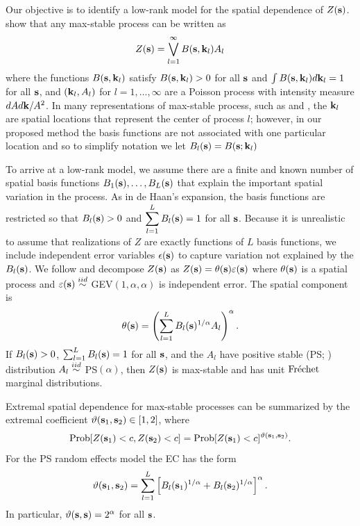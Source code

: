 Our objective is to identify a low-rank model for the spatial dependence of $Z(\mathbf{s})$.
 show that any max-stable process can be written as
\begin{align} \label{ebeq:spectral}
  Z(\mathbf{s}) = \bigvee_{l = 1}^{\infty} B(\mathbf{s}, \mathbf{k}_l)A_{l}
\end{align}
where the functions $B(\mathbf{s}, \mathbf{k}_l)$ satisfy $B(\mathbf{s}, \mathbf{k}_l) > 0$ for all $\mathbf{s}$ and $\int B(\mathbf{s}, \mathbf{k}_l) d\mathbf{k}_l = 1$ for all $\mathbf{s}$, and $(\mathbf{k}_l, A_l)$ for $l=1,\ldots,\infty$ are a Poisson process with intensity measure $dA d\mathbf{k}/A^2$.
In many representations of max-stable process, such as \citet{Smith1990} and \citet{Reich2012}, the $\mathbf{k}_l$ are spatial locations that represent the center of process $l$; however, in our proposed method the basis functions are not associated with one particular location and so to simplify notation we let $B_l(\mathbf{s}) = B(\mathbf{s}; \mathbf{k}_l)$

To arrive at a low-rank model, we assume there are a finite and known number of spatial basis functions $B_1(\mathbf{s}), \ldots, B_L(\mathbf{s})$ that explain the important spatial variation in the process.
As in de Haan's expansion, the basis functions are restricted so that $B_l(\mathbf{s}) > 0$ and $\displaystyle \sum_{l = 1}^L B_l(\mathbf{s}) = 1$ for all $\mathbf{s}$.
Because it is unrealistic to assume that realizations of $Z$ are exactly functions of $L$ basis functions, we include independent error variables $\epsilon(\mathbf{s})$ to capture variation not explained by the $B_l(\mathbf{s})$.
We follow \citet{Reich2012} and decompose $Z(\mathbf{s})$ as $Z(\mathbf{s})=\theta(\mathbf{s})\varepsilon(\mathbf{s})$ where $\theta(\mathbf{s})$ is a spatial process and $\varepsilon(\mathbf{s})\stackrel{iid}{\sim}$ GEV$(1,\alpha,\alpha)$ is independent error.
The spatial component is
\begin{align} \label{ebeq:theta}
  \theta(\mathbf{s}) = \left(\sum_{l=1}^LB_{l}(\mathbf{s})^{1/\alpha}A_{l}\right)^{\alpha}.
\end{align}
If $B_{l}(\mathbf{s})>0$, $\sum_{l=1}^LB_{l}(\mathbf{s})=1$ for all $\mathbf{s}$, and the $A_{l}$ have positive stable (PS; ) distribution $A_{l}\stackrel{iid}{\sim}$ PS$(\alpha)$, then $Z(\mathbf{s})$ is max-stable and has unit $\mbox{Fr$\acute{\mbox{e}}$chet }$ marginal distributions.

Extremal spatial dependence for max-stable processes can be summarized by the extremal coefficient \citep[EC]{Schlather2003} $\vartheta(\mathbf{s}_1, \mathbf{s}_2)\in[1,2]$, where
\begin{align} \label{ebeq:ECdev}
  \mbox{Prob}[Z(\mathbf{s}_1)<c, Z(\mathbf{s}_2)<c] = \mbox{Prob}[Z(\mathbf{s}_1)<c]^{\vartheta(\mathbf{s}_1,\mathbf{s}_2)}.
\end{align}
For the PS random effects model the EC has the form
\begin{align} \label{ebeq:EC}
   \vartheta(\mathbf{s}_1,\mathbf{s}_2) = \sum_{l=1}^L \left[B_{l}(\mathbf{s}_1)^{1/\alpha}+B_{l}(\mathbf{s}_2)^{1/\alpha}\right]^\alpha.
\end{align}
In particular, $\vartheta(\mathbf{s},\mathbf{s}) = 2^{\alpha}$ for all $\mathbf{s}$.

